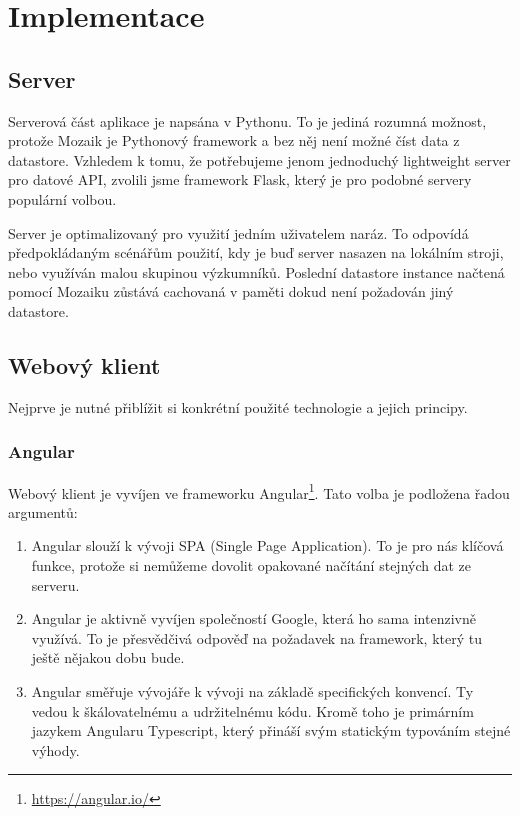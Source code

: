\chapter{Implementace}
\label{chap:implementation}

\section{Server}

Serverová část aplikace je napsána v Pythonu. To je jediná rozumná možnost, protože Mozaik je Pythonový framework a bez něj není možné číst data z datastore. Vzhledem k tomu, že potřebujeme jenom jednoduchý lightweight server pro datové API, zvolili jsme framework Flask, který je pro podobné servery populární volbou.

Server je optimalizovaný pro využití jedním uživatelem naráz. To odpovídá předpokládaným scénářům použití, kdy je buď server nasazen na lokálním stroji, nebo využíván malou skupinou výzkumníků. Poslední datastore instance načtená pomocí Mozaiku zůstává cachovaná v paměti dokud není požadován jiný datastore.

\section{Webový klient}

Nejprve je nutné přiblížit si konkrétní použité technologie a jejich principy.

\subsection{Angular}

Webový klient je vyvíjen ve frameworku Angular\footnote{\url{https://angular.io/}}. Tato volba je podložena řadou argumentů:

\begin{enumerate}
  \item Angular slouží k vývoji SPA (Single Page Application). To je pro nás klíčová funkce, protože si nemůžeme dovolit opakované načítání stejných dat ze serveru.
  \item Angular je aktivně vyvíjen společností Google, která ho sama intenzivně využívá. To je přesvědčivá odpověď na požadavek na framework, který tu ještě nějakou dobu bude.
  \item Angular směřuje vývojáře k vývoji na základě specifických konvencí. Ty vedou k škálovatelnému a udržitelnému kódu. Kromě toho je primárním jazykem Angularu Typescript, který přináší svým statickým typováním stejné výhody.
\end{enumerate}

